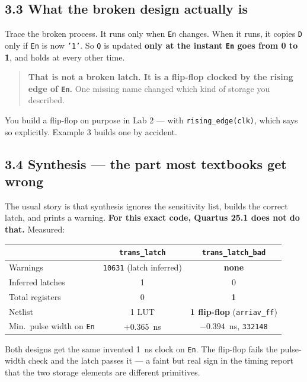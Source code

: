 \documentclass[11pt]{article}
\newcommand{\code}[1]{\texttt{#1}}
\begin{document}
\subsection*{3.3 What the broken design actually is}

Trace the broken process. It runs only when \code{En} changes. When it runs, it
copies \code{D} only if \code{En} is now \code{'1'}. So \code{Q} is updated
\textbf{only at the instant \code{En} goes from 0 to 1}, and holds at every other
time.

\begin{quote}
\textbf{That is not a broken latch. It is a flip-flop clocked by the rising edge of
\code{En}.} One missing name changed which kind of storage you described.
\end{quote}

You build a flip-flop on purpose in Lab 2 --- with \code{rising\_edge(clk)}, which
says so explicitly. Example 3 builds one by accident.

\subsection*{3.4 Synthesis --- the part most textbooks get wrong}

The usual story is that synthesis ignores the sensitivity list, builds the correct
latch, and prints a warning. \textbf{For this exact code, Quartus 25.1 does not do
that.} Measured:

\begin{center}
\begin{tabular}{lcc}
\toprule
& \code{trans\_latch} & \code{trans\_latch\_bad} \\
\midrule
Warnings & \code{10631} (latch inferred) & \textbf{none} \\
Inferred latches & 1 & 0 \\
Total registers & 0 & \textbf{1} \\
Netlist & 1 LUT & \textbf{1 flip-flop} (\code{arriav\_ff}) \\
Min.\ pulse width on \code{En} & $+0.365$~ns & $\mathbf{-0.394}$~ns, \code{332148} \\
\bottomrule
\end{tabular}
\end{center}

Both designs get the same invented 1~ns clock on \code{En}. The flip-flop fails the
pulse-width check and the latch passes it --- a faint but real sign in the timing
report that the two storage elements are different primitives.
\end{document}
